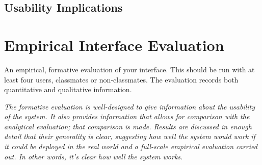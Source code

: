 \documentclass[conference]{IEEEtran}
\begin{document}
\subsection{Usability Implications}


\section{Empirical Interface Evaluation}
An empirical, formative evaluation of your interface. This should be run with at least four users, classmates or non-classmates. The evaluation records both quantitative and qualitative information. 

\emph{The formative evaluation is well-designed to give information about the usability of the system. It also provides information that allows for comparison with the analytical evaluation; that comparison is made. Results are discussed in enough detail that their generality is clear, suggesting how well the system would work if it could be deployed in the real world and a full-scale empirical evaluation carried out. In other words, it's clear how well the system works.}


%
%

\end{document}
